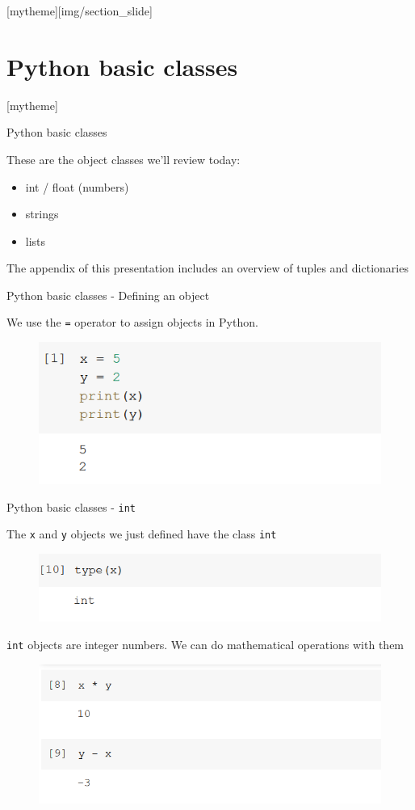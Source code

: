 \documentclass[aspectratio=169]{beamer}
\newcommand{\sectionpic}[2]{
	\setbeamertemplate{section page}[mytheme][#2]
	\section{#1}
	\setbeamertemplate{section page}[mytheme]
}
\begin{document}
\sectionpic{Python basic classes}{img/section_slide}

\begin{frame}{Python basic classes}

	These are the object classes we'll review today:

	\begin{itemize}
		\item int / float (numbers)
		\item strings
		\item lists
	\end{itemize}

	The appendix of this presentation includes an overview of tuples and dictionaries

\end{frame}

\begin{frame}{Python basic classes - Defining an object}

	We use the \texttt{=} operator to assign objects in Python.

	\begin{figure}
		\centering
		\includegraphics[width=0.6\linewidth]{img/assignation.png}
	\end{figure}

\end{frame}

\begin{frame}{Python basic classes - \texttt{int}}

	The \texttt{x} and \texttt{y} objects we just defined have the class \texttt{int}

	\begin{figure}
		\centering
		\includegraphics[width=0.6\linewidth]{img/type_int.png}
	\end{figure}

	\texttt{int} objects are integer numbers. We can do mathematical operations with them
	\begin{figure}
		\centering
		\includegraphics[width=0.6\linewidth]{img/math_integers.png}
	\end{figure}

\end{frame}
\end{document}
